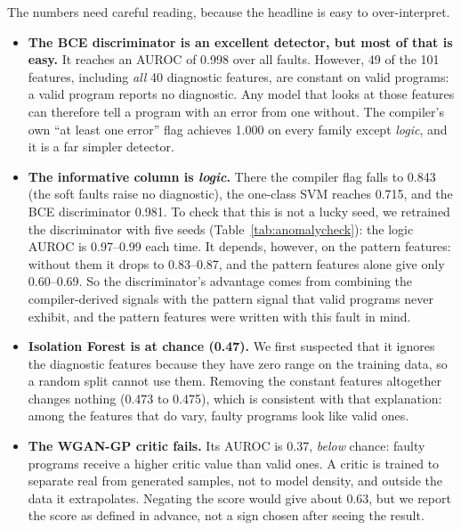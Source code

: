 \documentclass[conference]{IEEEtran}
\begin{document}
The numbers need careful reading, because the headline is easy to over-interpret.

\begin{itemize}
    \item \textbf{The BCE discriminator is an excellent detector, but most of that is easy.} It reaches an AUROC of 0.998 over all faults. However,
    49 of the 101 features, including \emph{all} 40 diagnostic features, are constant on valid programs: a valid program reports no diagnostic. Any
    model that looks at those features can therefore tell a program with an error from one without. The compiler's own ``at least one error'' flag
    achieves 1.000 on every family except \emph{logic}, and it is a far simpler detector.
    \item \textbf{The informative column is \emph{logic}.} There the compiler flag falls to 0.843 (the soft faults raise no diagnostic), the one-class
    SVM reaches 0.715, and the BCE discriminator 0.981. To check that this is not a lucky seed, we retrained the discriminator with five seeds
    (Table~\ref{tab:anomalycheck}): the logic AUROC is 0.97--0.99 each time. It depends, however, on the pattern features: without them it drops to
    0.83--0.87, and the pattern features alone give only 0.60--0.69. So the discriminator's advantage comes from combining the
    compiler-derived signals with the pattern signal that valid programs never exhibit, and the pattern features were written with this fault in mind.
    \item \textbf{Isolation Forest is at chance (0.47).} We first suspected that it ignores the diagnostic features because they have zero range on the
    training data, so a random split cannot use them. Removing the constant features altogether changes nothing (0.473 to 0.475), which is consistent with that
    explanation: among the features that do vary, faulty programs look like valid ones.
    \item \textbf{The WGAN-GP critic fails.} Its AUROC is 0.37, \emph{below} chance: faulty programs receive a higher critic value than valid ones. A critic is
    trained to separate real from generated samples, not to model density, and outside the data it extrapolates. Negating the score would give about 0.63, but we report the
    score as defined in advance, not a sign chosen after seeing the result.
\end{itemize}
\end{document}
